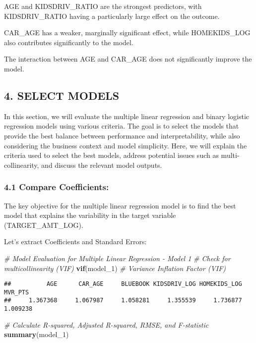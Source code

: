 \documentclass[
]{article}
\newenvironment{Shaded}{\begin{snugshade}}{\end{snugshade}}
\newcommand{\CommentTok}[1]{\textcolor[rgb]{0.56,0.35,0.01}{\textit{#1}}}
\newcommand{\FunctionTok}[1]{\textcolor[rgb]{0.13,0.29,0.53}{\textbf{#1}}}
\newcommand{\NormalTok}[1]{#1}
\begin{document}
AGE and KIDSDRIV\_RATIO are the strongest predictors, with
KIDSDRIV\_RATIO having a particularly large effect on the outcome.

CAR\_AGE has a weaker, marginally significant effect, while
HOMEKIDS\_LOG also contributes significantly to the model.

The interaction between AGE and CAR\_AGE does not significantly improve
the model.

\subsection{4. SELECT MODELS}\label{select-models}

In this section, we will evaluate the multiple linear regression and
binary logistic regression models using various criteria. The goal is to
select the models that provide the best balance between performance and
interpretability, while also considering the business context and model
simplicity. Here, we will explain the criteria used to select the best
models, address potential issues such as multi-collinearity, and discuss
the relevant model outputs.

\subsubsection{4.1 Compare Coefficients:}\label{compare-coefficients}

The key objective for the multiple linear regression model is to find
the best model that explains the variability in the target variable
(TARGET\_AMT\_LOG).

Let's extract Coefficients and Standard Errors:

\begin{Shaded}
\begin{Highlighting}[]
\CommentTok{\# Model Evaluation for Multiple Linear Regression {-} Model 1}
\CommentTok{\# Check for multicollinearity (VIF)}
\FunctionTok{vif}\NormalTok{(model\_1)  }\CommentTok{\# Variance Inflation Factor (VIF)}
\end{Highlighting}
\end{Shaded}

\begin{verbatim}
##          AGE      CAR_AGE     BLUEBOOK KIDSDRIV_LOG HOMEKIDS_LOG      MVR_PTS 
##     1.367368     1.067987     1.058281     1.355539     1.736877     1.009238
\end{verbatim}

\begin{Shaded}
\begin{Highlighting}[]
\CommentTok{\# Calculate R{-}squared, Adjusted R{-}squared, RMSE, and F{-}statistic}
\FunctionTok{summary}\NormalTok{(model\_1)}
\end{Highlighting}
\end{Shaded}
\end{document}
